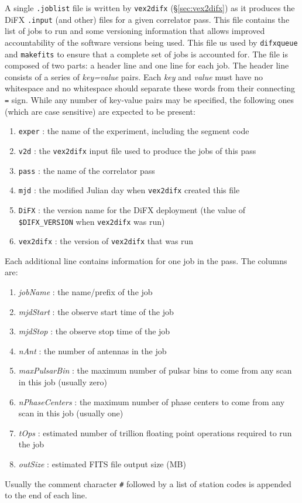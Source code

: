 A single {\tt .joblist} file is written by {\tt vex2difx} (\S\ref{sec:vex2difx}) as it produces the DiFX {\tt .input} (and other) files for a given correlator pass.
This file contains the list of jobs to run and some versioning information that allows improved accountability of the software versions being used.
This file us used by {\tt difxqueue} and {\tt makefits} to ensure that a complete set of jobs is accounted for.
The file is composed of two parts: a header line and one line for each job.
The header line consists of a series of {\em key=value} pairs.  
Each {\em key} and {\em value} must have no whitespace and no whitespace should separate these words from their connecting {\tt =} sign.
While any number of key-value pairs may be specified, the following ones (which are case sensitive) are expected to be present:
\begin{enumerate}
\item {\tt exper} : the name of the experiment, including the segment code
\item {\tt v2d} : the {\tt vex2difx} input file used to produce the jobs of this pass
\item {\tt pass} : the name of the correlator pass
\item {\tt mjd} : the modified Julian day when {\tt vex2difx} created this file
\item {\tt DiFX} : the version name for the DiFX deployment (the value of {\tt \$DIFX\_VERSION} when {\tt vex2difx} was run)
\item {\tt vex2difx} : the version of {\tt vex2difx} that was run
\end{enumerate}
Each additional line contains information for one job in the pass.
The columns are:
\begin{enumerate}
\item {\em jobName} : the name/prefix of the job
\item {\em mjdStart} : the observe start time of the job
\item {\em mjdStop} : the observe stop time of the job
\item {\em nAnt} : the number of antennas in the job
\item {\em maxPulsarBin} : the maximum number of pulsar bins to come from any scan in this job (usually zero)
\item {\em nPhaseCenters} : the maximum number of phase centers to come from any scan in this job (usually one)
\item {\em tOps} : estimated number of trillion floating point operations required to run the job
\item {\em outSize} : estimated FITS file output size (MB)
\end{enumerate}
Usually the comment character {\tt \#} followed by a list of station codes is appended to the end of each line.








